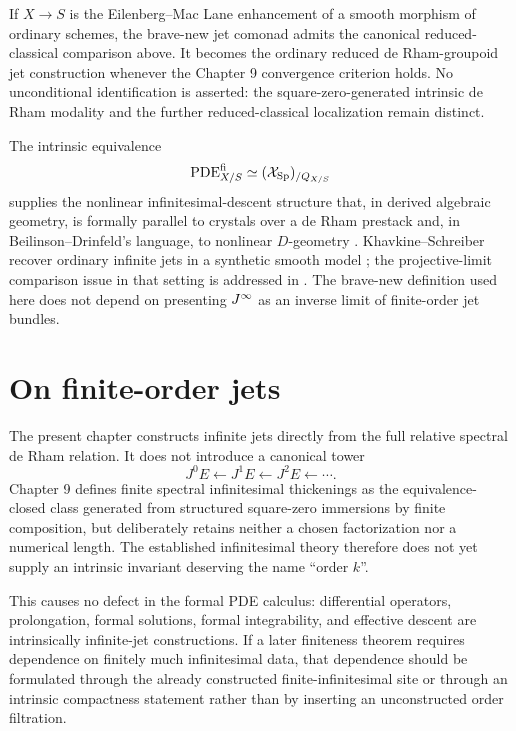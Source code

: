 \begin{remark}
If $X\to S$ is the Eilenberg--Mac Lane enhancement of a smooth morphism of ordinary schemes, the brave-new jet comonad admits the canonical reduced-classical comparison above.  It becomes the ordinary reduced de Rham-groupoid jet construction whenever the Chapter 9 convergence criterion holds.  No unconditional identification is asserted: the square-zero-generated intrinsic de Rham modality and the further reduced-classical localization remain distinct.
\end{remark}

\begin{remark}
The intrinsic equivalence
\[
    \operatorname{PDE}^{\mathrm{fi}}_{X/S}\simeq(\mathcal{X}_{\mathrm{Sp}})_{/Q_{X/S}}
\]
supplies the nonlinear infinitesimal-descent structure that, in derived algebraic geometry, is formally parallel to crystals over a de Rham prestack and, in Beilinson--Drinfeld's language, to nonlinear $D$-geometry \cite{GaitsgoryRozenblyum2011,BeilinsonDrinfeld2004}.  Khavkine--Schreiber recover ordinary infinite jets in a synthetic smooth model \cite{KhavkineSchreiber2017}; the projective-limit comparison issue in that setting is addressed in \cite{GiotopoulosKhavkineSatiSchreiber2026}.  The brave-new definition used here does not depend on presenting $J^{\infty}$ as an inverse limit of finite-order jet bundles.
\end{remark}

\section{On finite-order jets}
\label{sec:no-finite-order-jets}

\begin{remark}
The present chapter constructs infinite jets directly from the full relative spectral de Rham relation.  It does not introduce a canonical tower
\[
    J^0E\leftarrow J^1E\leftarrow J^2E\leftarrow\cdots.
\]
Chapter 9 defines finite spectral infinitesimal thickenings as the equivalence-closed class generated from structured square-zero immersions by finite composition, but deliberately retains neither a chosen factorization nor a numerical length.  The established infinitesimal theory therefore does not yet supply an intrinsic invariant deserving the name ``order $k$''.

This causes no defect in the formal PDE calculus: differential operators, prolongation, formal solutions, formal integrability, and effective descent are intrinsically infinite-jet constructions.  If a later finiteness theorem requires dependence on finitely much infinitesimal data, that dependence should be formulated through the already constructed finite-infinitesimal site or through an intrinsic compactness statement rather than by inserting an unconstructed order filtration.
\end{remark}


